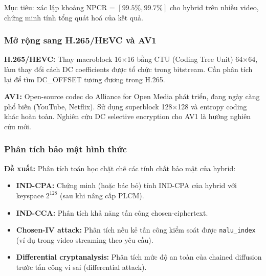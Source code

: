 Mục tiêu: xác lập khoảng NPCR = $[99.5\%, 99.7\%]$ cho hybrid trên nhiều video,
chứng minh tính tổng quát hoá của kết quả.

\subsubsection{Mở rộng sang H.265/HEVC và AV1}

\textbf{H.265/HEVC:} Thay macroblock 16$\times$16 bằng CTU (Coding Tree Unit)
64$\times$64, làm thay đổi cách DC coefficients được tổ chức trong bitstream.
Cần phân tích lại để tìm DC\_OFFSET tương đương trong H.265.

\textbf{AV1:} Open-source codec do Alliance for Open Media phát triển,
đang ngày càng phổ biến (YouTube, Netflix). Sử dụng superblock 128$\times$128
và entropy coding khác hoàn toàn. Nghiên cứu DC selective encryption cho AV1
là hướng nghiên cứu mới.

\subsubsection{Phân tích bảo mật hình thức}

\textbf{Đề xuất:} Phân tích toán học chặt chẽ các tính chất bảo mật của hybrid:
\begin{itemize}
  \item \textbf{IND-CPA:} Chứng minh (hoặc bác bỏ) tính IND-CPA của hybrid
        với keyspace $2^{128}$ (sau khi nâng cấp PLCM).
  \item \textbf{IND-CCA:} Phân tích khả năng tấn công chosen-ciphertext.
  \item \textbf{Chosen-IV attack:} Phân tích nếu kẻ tấn công kiểm soát được
        \texttt{nalu\_index} (ví dụ trong video streaming theo yêu cầu).
  \item \textbf{Differential cryptanalysis:} Phân tích mức độ an toàn của
        chained diffusion trước tấn công vi sai (differential attack).
\end{itemize}


